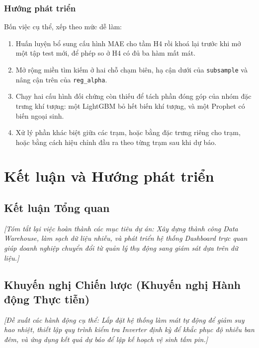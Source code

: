 \documentclass[12pt, a4paper]{report}
\begin{document}
\FloatBarrier
\subsection{Hướng phát triển}

Bốn việc cụ thể, xếp theo mức dễ làm:

\begin{enumerate}
    \item Huấn luyện bổ sung cấu hình MAE cho tầm H4 rồi khoá lại trước khi mở một tập test
    mới, để phép so ở H4 có đủ ba hàm mất mát.
    \item Mở rộng miền tìm kiếm ở hai chỗ chạm biên, hạ cận dưới của \texttt{subsample} và
    nâng cận trên của \texttt{reg\_alpha}.
    \item Chạy hai cấu hình đối chứng còn thiếu để tách phần đóng góp của nhóm đặc trưng khí
    tượng: một LightGBM bỏ hết biến khí tượng, và một Prophet có biến ngoại sinh.
    \item Xử lý phần khác biệt giữa các trạm, hoặc bằng đặc trưng riêng cho trạm, hoặc bằng
    cách hiệu chỉnh đầu ra theo từng trạm sau khi dự báo.
\end{enumerate}


\setcounter{topnumber}{2}
\setcounter{bottomnumber}{1}
\setcounter{totalnumber}{3}
\renewcommand{\topfraction}{0.7}
\renewcommand{\bottomfraction}{0.3}
\renewcommand{\textfraction}{0.2}
\renewcommand{\floatpagefraction}{0.5}

\newpage
\chapter{Kết luận và Hướng phát triển}
\label{chap:conclusion}

\section{Kết luận Tổng quan}
\label{sec:conclusion}
\textit{[Tóm tắt lại việc hoàn thành các mục tiêu dự án: Xây dựng thành công Data Warehouse, làm sạch dữ liệu nhiễu, và phát triển hệ thống Dashboard trực quan giúp doanh nghiệp chuyển đổi từ quản lý thụ động sang giám sát dựa trên dữ liệu.]}

\section{Khuyến nghị Chiến lược (Khuyến nghị Hành động Thực tiễn)}
\label{sec:recommendations}
\textit{[Đề xuất các hành động cụ thể: Lắp đặt hệ thống làm mát tự động để giảm suy hao nhiệt, thiết lập quy trình kiểm tra Inverter định kỳ để khắc phục độ nhiễu ban đêm, và ứng dụng kết quả dự báo để lập kế hoạch vệ sinh tấm pin.]}
\end{document}

